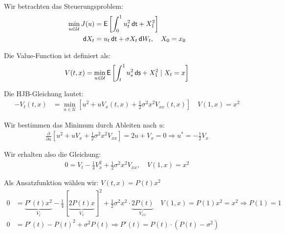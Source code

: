 \documentclass[a4paper, 12pt]{scrartcl}
\newcommand{\dt}{\thinspace \mathsf{dt}}
\newcommand{\ds}{\thinspace \mathsf{ds}}
\newcommand{\dW}{\thinspace \mathsf{d}W}
\newcommand{\dX}{\thinspace \mathsf{d}X}
\begin{document}
\begin{beispiel}
    Wir betrachten das Steuerungsproblem:
    \begin{align*}
        \min_{u \in \mathcal{U}} J(u) 
        &= \mathsf{E}
        \left[
            \int_0^1 u_t^2 \dt + X_1^2
        \right]
        \\
        \dX_t &= u_t \dt + \sigma X_t \dW_t,
        \quad X_0 = x_0
    \end{align*}

    Die Value-Function ist definiert als:
    \begin{align*}
        V(t,x) = \min_{u \in \mathcal{U}} 
        \mathsf{E}
        \left[
            \int_t^1 u_s^2 \ds + X_1^2 \mid X_t = x
        \right]
    \end{align*}

    Die HJB-Gleichung lautet:
    \begin{align*}
        - V_t(t,x) 
        &= \min_{u \in \mathcal{U}} 
        \left[
            u^2 + u V_x(t,x) + \frac{1}{2} \sigma^2 x^2 V_{xx}(t,x)
        \right]
        \quad
        V(1,x) = x^2
    \end{align*}

    Wir bestimmen das Minimum durch Ableiten nach $u$:
    \begin{align*}
        \frac{\partial}{\partial u}
        \left[
            u^2 + u V_x + \frac{1}{2} \sigma^2 x^2 V_{xx}
        \right] = 2u + V_x = 0 
        \Rightarrow
        u^* = -\frac{1}{2} V_x
    \end{align*}

    Wir erhalten also die Gleichung: 
    \begin{align*}
        0 = V_t -\frac{1}{4} V_x^2 + \frac{1}{2} \sigma^2 x^2 V_{xx}, 
        \quad V(1,x) = x^2
    \end{align*}

    Als Ansatzfunktion wählen wir: $V(t,x) = P(t)x^2$
    \begin{align*}
        0 &= \underbrace{P'(t)x^2}_{V_t} - \frac{1}{4} \left[ \underbrace{2P(t)x}_{V_x} \right]^2 
        + \frac{1}{2} \sigma^2 x^2 \cdot \underbrace{2P(t)}_{V_{xx}} 
        \quad V(1,x) = P(1)x^2  = x^2 \Rightarrow P(1) = 1
        \\
        0 &= P'(t) - P(t)^2 + \sigma^2 P(t) 
        \Rightarrow
        P'(t) = P(t) \cdot (P(t) - \sigma^2)
    \end{align*}


\end{beispiel}
\end{document}
